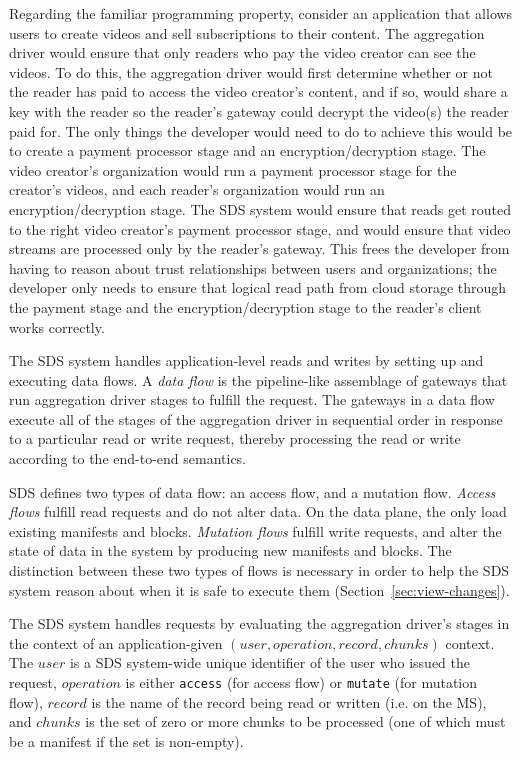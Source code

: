 Regarding the familiar programming property, consider an application that allows users to
create videos and sell subscriptions to their content.  The aggregation
driver would ensure that only readers who pay the video creator can see
the videos.  To do this, the aggregation driver would first determine whether or not the
reader has paid to access the video creator's content, and if so, would
share a key with the reader so the reader's gateway could decrypt the
video(s) the reader paid for.  The only things the developer would
need to do to achieve this would be to create a payment processor stage and an
encryption/decryption stage.  The video creator's organization would run a
payment processor stage for the creator's videos, and each reader's
organization would run an encryption/decryption stage.  The SDS system
would ensure that reads get routed to the right video creator's payment
processor stage, and would ensure that video streams are processed only by
the reader's gateway.  This frees the developer from having to reason
about trust relationships between users and organizations; the developer
only needs to ensure that logical read path from cloud storage through the payment
stage and the encryption/decryption stage to the reader's client works
correctly.

The SDS system handles application-level reads and writes by setting up and
executing data flows.  A \emph{data flow} is the pipeline-like assemblage of gateways
that run aggregation driver stages to fulfill the request.  The gateways in a data flow execute all
of the stages of the aggregation driver in sequential order in response to a
particular read or write request, thereby processing the
read or write according to the end-to-end semantics.

SDS defines two types of data flow:  an access flow, and a mutation flow.
\emph{Access flows} fulfill read requests and do not alter data.  On the data
plane, the only load existing manifests and blocks.
\emph{Mutation flows} fulfill write requests, and alter
the state of data in the system by producing new manifests and blocks.
The distinction between these two types of flows is necessary in order to help
the SDS system reason about when it is safe to execute them 
(Section~\ref{sec:view-changes}).

The SDS system handles requests by evaluating the aggregation driver's stages in the context of
an application-given $(user, operation, record, chunks)$ context.  The
$user$ is a SDS system-wide unique identifier of the user who issued the request,
$operation$ is either \texttt{access} (for access flow) or \texttt{mutate} (for
mutation flow), $record$ is the name of the record being read or written (i.e. on
the MS), and $chunks$ is the set of zero or more chunks to be processed (one of which must be
a manifest if the set is non-empty).

